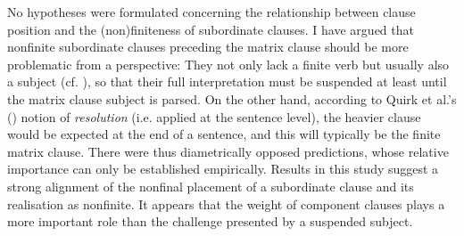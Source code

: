 No hypotheses were formulated concerning the relationship between clause position and the (non)finiteness of subordinate clauses. I have argued that nonfinite subordinate clauses preceding the matrix clause should be more problematic from a  perspective: They not only lack a finite verb but usually also a subject (cf. ), so that their full interpretation must be suspended at least until the matrix clause subject is parsed. On the other hand, according to Quirk et al.’s (\citeyear[1036]{QuirkEtAl1985}) notion of \textit{resolution} (i.e.  applied at the sentence level), the heavier clause would be expected at the end of a sentence, and this will typically be the finite matrix clause. There were thus diametrically opposed predictions, whose relative importance can only be established empirically. Results in this study suggest a strong alignment of the nonfinal placement of a subordinate clause and its realisation as nonfinite. It appears that the weight of component clauses plays a more important role than the challenge presented by a suspended subject.

